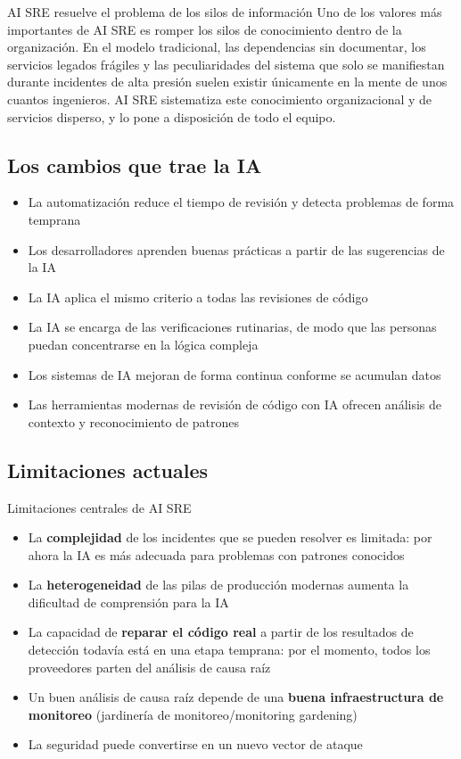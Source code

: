 \documentclass[a4paper]{article}
\begin{document}
\begin{knowledgebox}{AI SRE resuelve el problema de los silos de información}
Uno de los valores más importantes de AI SRE es romper los silos de conocimiento dentro de la organización. En el modelo tradicional, las dependencias sin documentar, los servicios legados frágiles y las peculiaridades del sistema que solo se manifiestan durante incidentes de alta presión suelen existir únicamente en la mente de unos cuantos ingenieros. AI SRE sistematiza este conocimiento organizacional y de servicios disperso, y lo pone a disposición de todo el equipo.
\end{knowledgebox}

\subsection{Los cambios que trae la IA}

\begin{itemize}
    \item La automatización reduce el tiempo de revisión y detecta problemas de forma temprana
    \item Los desarrolladores aprenden buenas prácticas a partir de las sugerencias de la IA
    \item La IA aplica el mismo criterio a todas las revisiones de código
    \item La IA se encarga de las verificaciones rutinarias, de modo que las personas puedan concentrarse en la lógica compleja
    \item Los sistemas de IA mejoran de forma continua conforme se acumulan datos
    \item Las herramientas modernas de revisión de código con IA ofrecen análisis de contexto y reconocimiento de patrones
\end{itemize}

\subsection{Limitaciones actuales}

\begin{warningbox}{Limitaciones centrales de AI SRE}
\begin{itemize}
    \item La \textbf{complejidad} de los incidentes que se pueden resolver es limitada: por ahora la IA es más adecuada para problemas con patrones conocidos
    \item La \textbf{heterogeneidad} de las pilas de producción modernas aumenta la dificultad de comprensión para la IA
    \item La capacidad de \textbf{reparar el código real} a partir de los resultados de detección todavía está en una etapa temprana: por el momento, todos los proveedores parten del análisis de causa raíz
    \item Un buen análisis de causa raíz depende de una \textbf{buena infraestructura de monitoreo} (jardinería de monitoreo/monitoring gardening)
    \item La seguridad puede convertirse en un nuevo vector de ataque
\end{itemize}
\end{warningbox}
\end{document}
